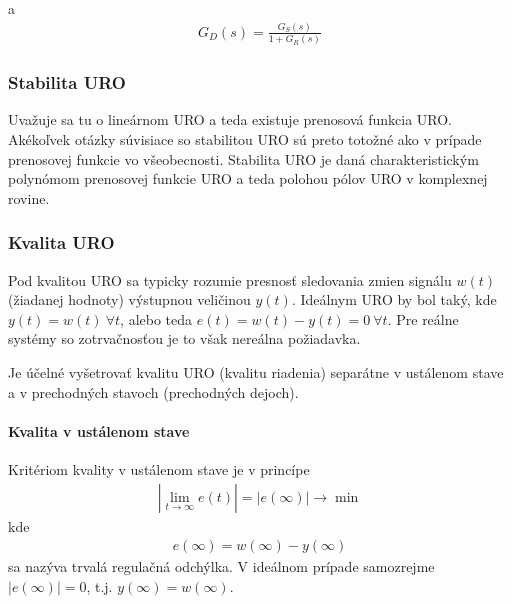 \documentclass[a4paper, 10pt, ]{article}
\begin{document}
\begin{center}


	\figcaption{}
	\label{schLinURO_GD.pdf}

\end{center}

\noindent
a
\begin{align}
    G_D(s) = \frac{G_S(s)}{1 + G_R(s)}
\end{align}




\subsubsection{Stabilita URO}

Uvažuje sa tu o lineárnom URO a teda existuje prenosová funkcia URO. Akékoľvek otázky súvisiace so stabilitou URO sú preto totožné ako v prípade prenosovej funkcie vo všeobecnosti. Stabilita URO je daná charakteristickým polynómom prenosovej funkcie URO a teda polohou pólov URO v komplexnej rovine.


\subsubsection{Kvalita URO}

Pod kvalitou URO sa typicky rozumie presnosť sledovania zmien signálu $w(t)$ (žiadanej hodnoty) výstupnou veličinou $y(t)$. Ideálnym URO by bol taký, kde $y(t) = w(t) \  \forall t$, alebo teda $e(t) = w(t) - y(t) = 0  \  \forall t$.
Pre reálne systémy so zotrvačnosťou je to však nereálna požiadavka.

Je účelné vyšetrovať kvalitu URO (kvalitu riadenia) separátne v ustálenom stave a v prechodných stavoch (prechodných dejoch).

\paragraph{Kvalita v ustálenom stave}

Kritériom kvality v ustálenom stave je v princípe
\begin{align}
    \left| \lim_{t \to \infty} e(t) \right| = \left| e(\infty) \right| \to \min
\end{align}
kde
\begin{align}
    e(\infty) = w(\infty) - y(\infty)
\end{align}
sa nazýva trvalá regulačná odchýlka. V ideálnom prípade samozrejme $\left| e(\infty) \right| = 0$, t.j. $y(\infty) = w(\infty)$.
\end{document}
